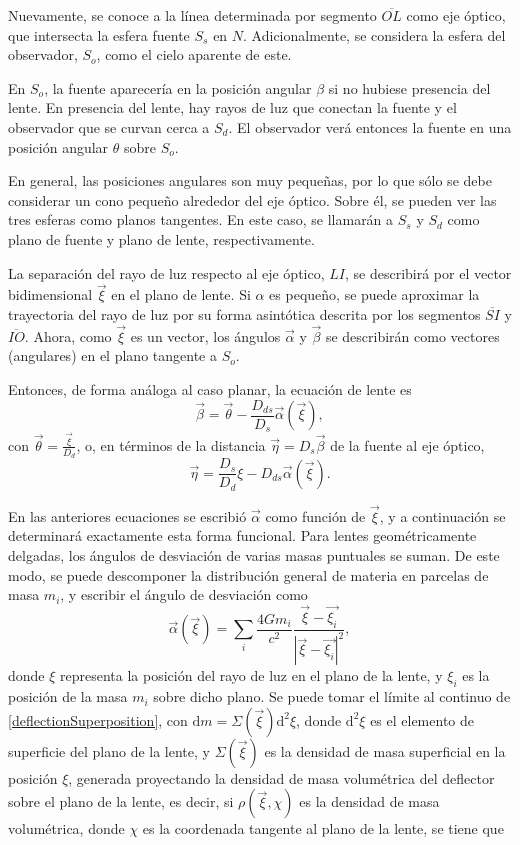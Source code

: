 Nuevamente, se conoce a la línea determinada por segmento $\overline{OL}$ como eje óptico, que intersecta la esfera fuente $S_s$ en $N$. Adicionalmente, se considera la esfera del observador, $S_o$, como el cielo aparente de este.

En $S_o$, la fuente aparecería en la posición angular $\beta$ si no hubiese presencia del lente. En presencia del lente, hay rayos de luz que conectan la fuente y el observador que se curvan cerca a $S_d$. El observador verá entonces la fuente en una posición angular $\theta$ sobre $S_o$.

En general, las posiciones angulares son muy pequeñas, por lo que sólo se debe considerar un cono pequeño alrededor del eje óptico. Sobre él, se pueden ver las tres esferas como planos tangentes. En este caso, se llamarán a $S_s$ y $S_d$ como plano de fuente y plano de lente, respectivamente.

La separación del rayo de luz respecto al eje óptico, $LI$, se describirá por el vector bidimensional $\vec{\xi}$ en el plano de lente. Si $\alpha$ es pequeño, se puede aproximar la trayectoria del rayo de luz por su forma asintótica descrita por los segmentos $\overline{SI}$ y $\overline{IO}$. Ahora, como $\vec{\xi}$ es un vector, los ángulos $\vec{\alpha}$ y $\vec{\beta}$ se describirán como vectores (angulares) en el plano tangente a $S_o$.

Entonces, de forma análoga al caso planar, la ecuación de lente es
\begin{equation}\label{newLensEquation}
	\vec{\beta}=\vec{\theta}-\frac{D_{ds}}{D_s}\vec{\alpha}(\vec{\xi}),
\end{equation}
con $\vec{\theta}=\frac{\vec{\xi}}{D_d}$, o, en términos de la distancia $\vec{\eta}=D_s\vec{\beta}$ de la fuente al eje óptico,
\begin{equation}
	\vec{\eta}=\frac{D_s}{D_d}\xi-D_{ds}\vec{\alpha}(\vec{\xi}).
\end{equation}

En las anteriores ecuaciones se escribió $\vec{\alpha}$ como función de $\vec{\xi}$, y a continuación se determinará exactamente esta forma funcional. Para lentes geométricamente delgadas, los ángulos de desviación de varias masas puntuales se suman. De este modo, se puede descomponer la distribución general de materia en parcelas de masa $m_i$, y escribir el ángulo de desviación como
\begin{equation}\label{deflectionSuperposition}
	\vec{\alpha}(\vec{\xi})=\sum_i \frac{4Gm_i}{c^2}\frac{\vec{\xi}-\vec{\xi_i}}{|\vec{\xi}-\vec{\xi_i}|^2},
\end{equation}
donde $\xi$ representa la posición del rayo de luz en el plano de la lente, y $\xi_i$ es la posición de la masa $m_i$ sobre dicho plano. Se puede tomar el límite al continuo de \eqref{deflectionSuperposition}, con $\mathrm{d}m=\Sigma(\vec{\xi})\mathrm{d}^2\xi$, donde $\mathrm{d}^2\xi$ es el elemento de superficie del plano de la lente, y $\Sigma(\vec{\xi})$ es la densidad de masa superficial en la posición $\xi$, generada proyectando la densidad de masa volumétrica del deflector sobre el plano de la lente, es decir, si $\rho(\vec{\xi},\chi)$ es la densidad de masa volumétrica, donde $\chi$ es la coordenada tangente al plano de la lente, se tiene que

